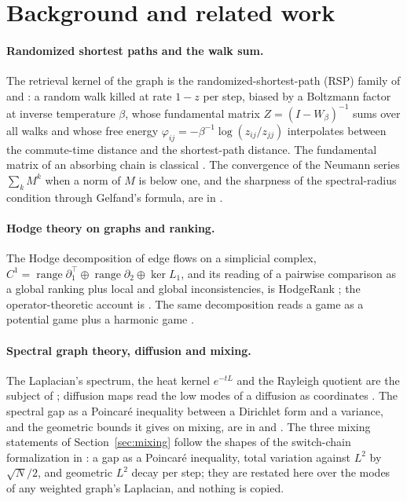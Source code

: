 \documentclass[11pt,a4paper]{article}
\theoremstyle{plain}
\theoremstyle{definition}
\theoremstyle{remark}
\DeclareMathOperator{\range}{range}
\begin{document}
\section{Background and related work}

\paragraph{Randomized shortest paths and the walk sum.}
The retrieval kernel of the graph is the randomized-shortest-path (RSP) family of
\citet{saerens2009rsp} and \citet{kivimaki2014rsp}: a random walk killed at rate $1-z$ per step,
biased by a Boltzmann factor at inverse temperature $\beta$, whose fundamental matrix
$Z = (I - W_\beta)^{-1}$ sums over all walks and whose free energy
$\varphi_{ij} = -\beta^{-1}\log(z_{ij}/z_{jj})$ interpolates between the commute-time distance
and the shortest-path distance. The fundamental matrix of an absorbing chain is classical
\citep{kemeny1960finite}. The convergence of the Neumann series $\sum_k M^k$ when a norm of $M$ is
below one, and the sharpness of the spectral-radius condition through Gelfand's formula, are in
\citet[Chapter~5]{horn2013matrix}.

\paragraph{Hodge theory on graphs and ranking.}
The Hodge decomposition of edge flows on a simplicial complex, $C^1 = \range\partial_1^{\top}
\oplus \range\partial_2 \oplus \ker L_1$, and its reading of a pairwise comparison as a global
ranking plus local and global inconsistencies, is HodgeRank \citep{jiang2011hodgerank}; the
operator-theoretic account is \citet{lim2020hodge}. The same decomposition reads a game as a
potential game plus a harmonic game \citep{candogan2011flows}.

\paragraph{Spectral graph theory, diffusion and mixing.}
The Laplacian's spectrum, the heat kernel $e^{-tL}$ and the Rayleigh quotient are the subject of
\citet{chung1997spectral}; diffusion maps read the low modes of a diffusion as coordinates
\citep{coifman2006diffusion}. The spectral gap as a Poincar\'e inequality between a Dirichlet
form and a variance, and the geometric bounds it gives on mixing, are in
\citet{diaconis1991geometric} and \citet{levin2017mixing}. The three mixing statements of
Section~\ref{sec:mixing} follow the shapes of the switch-chain formalization in
\citet{openai2026switch}: a gap as a Poincar\'e inequality, total variation against $L^2$ by
$\sqrt{N}/2$, and geometric $L^2$ decay per step; they are restated here over the modes of any
weighted graph's Laplacian, and nothing is copied.
\end{document}
